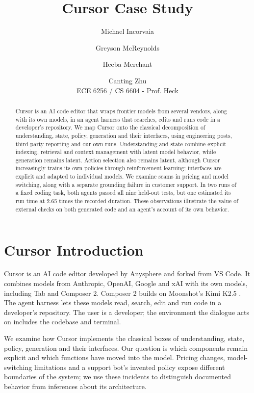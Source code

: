 \documentclass[11pt]{article}
\title{Cursor Case Study}
\author{Michael Incorvaia \and Greyson McReynolds \and Heeba Merchant \and Canting Zhu \\
       ECE 6256 / CS 6604 - Prof. Heck}
\begin{document}
\maketitle
\begin{abstract}
Cursor is an AI code editor that wraps frontier models from several vendors, along with its own models, in an agent harness that searches, edits and runs code in a developer's repository. We map Cursor onto the classical decomposition of understanding, state, policy, generation and their interfaces, using engineering posts, third-party reporting and our own runs. Understanding and state combine explicit indexing, retrieval and context management with latent model behavior, while generation remains latent. Action selection also remains latent, although Cursor increasingly trains its own policies through reinforcement learning; interfaces are explicit and adapted to individual models. We examine seams in pricing and model switching, along with a separate grounding failure in customer support. In two runs of a fixed coding task, both agents passed all nine held-out tests, but one estimated its run time at 2.65 times the recorded duration. These observations illustrate the value of external checks on both generated code and an agent's account of its own behavior.
\end{abstract}

\section{Cursor Introduction}

Cursor is an AI code editor developed by Anysphere and forked from VS Code. It combines models from Anthropic, OpenAI, Google and xAI with its own models, including Tab and Composer 2. Composer 2 builds on Moonshot's Kimi K2.5 \citep{datacamp2026composer2}. The agent harness lets these models read, search, edit and run code in a developer's repository. The user is a developer; the environment the dialogue acts on includes the codebase and terminal.

We examine how Cursor implements the classical boxes of understanding, state, policy, generation and their interfaces. Our question is which components remain explicit and which functions have moved into the model. Pricing changes, model-switching limitations and a support bot's invented policy expose different boundaries of the system; we use these incidents to distinguish documented behavior from inferences about its architecture.
\end{document}
